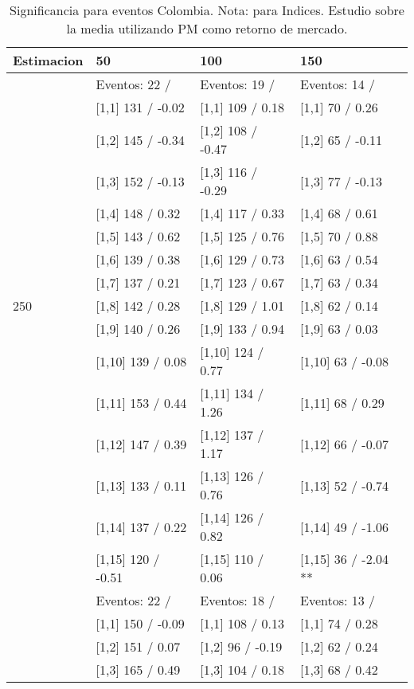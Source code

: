 \begin{table}

\caption{Significancia para eventos Colombia. Nota: para Indices. Estudio sobre la media utilizando PM como retorno de mercado.}
\centering
\begin{tabular}[t]{llll}
\toprule
Estimacion & 50 & 100 & 150\\
\midrule
 & Eventos:  22 / & Eventos:  19 / & Eventos:  14 /\\
 & {}[1,1] 131  / -0.02 & {}[1,1] 109  / 0.18 & {}[1,1] 70  / 0.26\\
 & {}[1,2] 145  / -0.34 & {}[1,2] 108  / -0.47 & {}[1,2] 65  / -0.11\\
 & {}[1,3] 152  / -0.13 & {}[1,3] 116  / -0.29 & {}[1,3] 77  / -0.13\\
 & {}[1,4] 148  / 0.32 & {}[1,4] 117  / 0.33 & {}[1,4] 68  / 0.61\\
\addlinespace
 & {}[1,5] 143  / 0.62 & {}[1,5] 125  / 0.76 & {}[1,5] 70  / 0.88\\
 & {}[1,6] 139  / 0.38 & {}[1,6] 129  / 0.73 & {}[1,6] 63  / 0.54\\
 & {}[1,7] 137  / 0.21 & {}[1,7] 123  / 0.67 & {}[1,7] 63  / 0.34\\
250 & {}[1,8] 142  / 0.28 & {}[1,8] 129  / 1.01 & {}[1,8] 62  / 0.14\\
 & {}[1,9] 140  / 0.26 & {}[1,9] 133  / 0.94 & {}[1,9] 63  / 0.03\\
\addlinespace
 & {}[1,10] 139  / 0.08 & {}[1,10] 124  / 0.77 & {}[1,10] 63  / -0.08\\
 & {}[1,11] 153  / 0.44 & {}[1,11] 134  / 1.26 & {}[1,11] 68  / 0.29\\
 & {}[1,12] 147  / 0.39 & {}[1,12] 137  / 1.17 & {}[1,12] 66  / -0.07\\
 & {}[1,13] 133  / 0.11 & {}[1,13] 126  / 0.76 & {}[1,13] 52  / -0.74\\
 & {}[1,14] 137  / 0.22 & {}[1,14] 126  / 0.82 & {}[1,14] 49  / -1.06\\
\addlinespace
 & {}[1,15] 120  / -0.51 & {}[1,15] 110  / 0.06 & {}[1,15] 36  / -2.04 **\\
 & Eventos:  22 / & Eventos:  18 / & Eventos:  13 /\\
 & {}[1,1] 150  / -0.09 & {}[1,1] 108  / 0.13 & {}[1,1] 74  / 0.28\\
 & {}[1,2] 151  / 0.07 & {}[1,2] 96  / -0.19 & {}[1,2] 62  / 0.24\\
 & {}[1,3] 165  / 0.49 & {}[1,3] 104  / 0.18 & {}[1,3] 68  / 0.42\\

\end{tabular}
\end{table}
